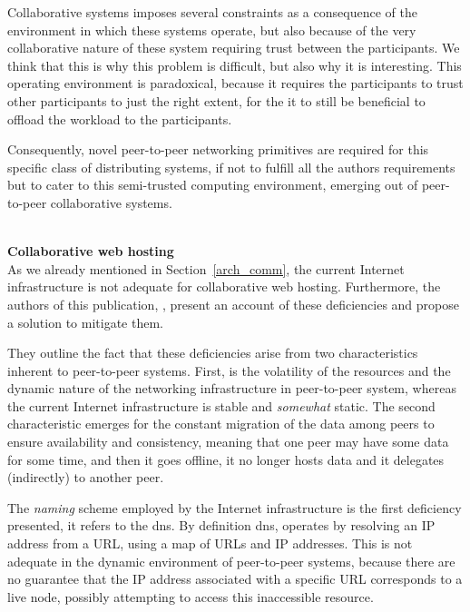 \documentclass[12pt, titlepage]{uo_temp}
\begin{document}
     Collaborative systems imposes several constraints as a consequence of the environment
     in which these systems operate, but also because of the very collaborative nature of
     these system requiring trust between the participants. We think that this is why this
     problem is difficult, but also why it is interesting. This operating environment is
     paradoxical, because it requires the participants to trust other participants to just
     the right extent, for the it to still be beneficial to offload the workload to the
     participants.
     
     Consequently, novel peer-to-peer networking primitives are required for this specific
     class of distributing systems, if not to fulfill all the authors requirements but to
     cater to this semi-trusted computing environment, emerging out of peer-to-peer
     collaborative systems. 
     
     \\ \textbf{Collaborative web hosting} \\ 
     As we already mentioned in Section~\ref{arch_comm}, the current Internet
     infrastructure is not adequate for collaborative web hosting. Furthermore, the
     authors of this publication, \cite{ahmed2014collaborative}, present an account of
     these deficiencies and propose a solution to mitigate them.

     They outline the fact that these deficiencies arise from two characteristics inherent
     to peer-to-peer systems. First, is the volatility of the resources and the dynamic
     nature of the networking infrastructure in peer-to-peer system, whereas the current
     Internet infrastructure is stable and \emph{somewhat} static. The second
     characteristic emerges for the constant migration of the data among peers to ensure
     availability and consistency, meaning that one peer may have some data for some time,
     and then it goes offline, it no longer hosts data and it delegates (indirectly) to
     another peer.

     The \emph{naming} scheme employed by the Internet infrastructure is the first
     deficiency presented, it refers to the \gls{dns}. By definition \gls{dns}, operates
     by resolving an IP address from a URL, using a map of URLs and IP addresses. This is
     not adequate in the dynamic environment of peer-to-peer systems, because there are no
     guarantee that the IP address associated with a specific URL corresponds to a live
     node, possibly attempting to access this inaccessible resource.
\end{document}
